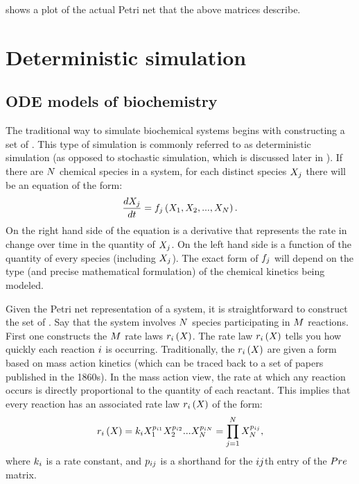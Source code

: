  shows a plot of the actual Petri net that the above matrices describe.

\section{Deterministic simulation}
\subsection{ODE models of biochemistry}
\label{sec:ode_models}

The traditional way to simulate biochemical systems begins with constructing a set of . This type of simulation is commonly referred to as deterministic simulation (as opposed to stochastic simulation, which is discussed later in ). If there are $N$ chemical species in a system, for each distinct species $X_{j}$ there will be an equation of the form:
\begin{equation*}
    \frac{dX_{j}}{dt} = f_{j}\left(X_1, X_2, ..., X_{N}\right).
\end{equation*}
On the right hand side of the equation is a derivative that represents the rate in change over time in the quantity of $X_{j}$. On the left hand side is a function of the quantity of every species (including $X_{j}$). The exact form of $f_{j}$ will depend on the type (and precise mathematical formulation) of the chemical kinetics being modeled.

Given the Petri net representation of a system, it is straightforward to construct the set of . Say that the system involves $N$ species participating in $M$ reactions. First one constructs the $M$ rate laws $r_{i} \left( X_{} \right)$. The rate law $r_{i} \left( X_{} \right)$ tells you how quickly each reaction $i$ is occurring. Traditionally, the $r_{i} \left( X_{} \right)$ are given a form based on mass action kinetics (which can be traced back to a set of papers published in the 1860s\supercite{Waage:1986bf}). In the mass action view, the rate at which any reaction occurs is directly proportional to the quantity of each reactant. This implies that every reaction has an associated rate law $r_{i} \left( X_{} \right)$ of the form:
\begin{equation}\label{eq:ratelaw_general_formula}
    r_{i} \left( X_{} \right) = k_{i} X_1^{p_{i 1}} X_2^{p_{i 2}} ... X_{N}^{p_{i N}} = \prod_{j = 1}^{N} X_{N}^{p_{i j}},
\end{equation}
where $k_{i}$ is a rate constant, and $p_{i j}$ is a shorthand for the $i j$th entry of the $Pre$ matrix.

